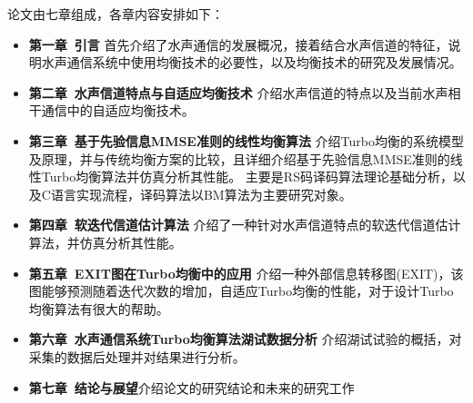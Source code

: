 论文由七章组成，各章内容安排如下：
\begin{itemize}
  \item \textbf{第一章~引言}\quad
    首先介绍了水声通信的发展概况，接着结合水声信道的特征，说明水声通信系统中使用均衡技术的必要性，以及均衡技术的研究及发展情况。
  \item \textbf{第二章~水声信道特点与自适应均衡技术}\quad
    介绍水声信道的特点以及当前水声相干通信中的自适应均衡技术。
  \item \textbf{第三章~基于先验信息MMSE准则的线性均衡算法}\quad
      介绍Turbo均衡的系统模型及原理，并与传统均衡方案的比较，且详细介绍基于先验信息MMSE准则的线性Turbo均衡算法并仿真分析其性能。
    主要是RS码译码算法理论基础分析，以及C语言实现流程，译码算法以BM算法为主要研究对象。
  \item \textbf{第四章~软迭代信道估计算法}\quad
    介绍了一种针对水声信道特点的软迭代信道估计算法，并仿真分析其性能。
  \item \textbf{第五章~EXIT图在Turbo均衡中的应用}\quad 
      介绍一种外部信息转移图(EXIT)，该图能够预测随着迭代次数的增加，自适应Turbo均衡的性能，对于设计Turbo均衡算法有很大的帮助。
  \item \textbf{第六章~水声通信系统Turbo均衡算法湖试数据分析}\quad 
      介绍湖试试验的概括，对采集的数据后处理并对结果进行分析。
  \item \textbf{第七章~结论与展望}\quad 介绍论文的研究结论和未来的研究工作
\end{itemize}
